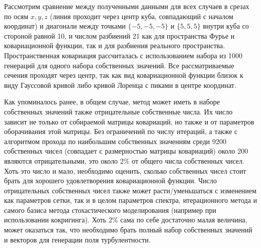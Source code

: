 Рассмотрим сравнение между полученными данными для всех случаев в срезах по осям $x, y, z$ (линия проходит через центр куба, совпадающий с началом координат) и диагонали между точками $\{-5, -5, -5\}$ и $\{5, 5, 5\}$ внутри куба со стороной равной 10, и числом разбиений 21 как для пространства Фурье и ковариационной функции, так и для разбиения реального пространства. Пространственная ковариация рассчиталась с использованием набора из 1000 генераций для одного набора собственных значений. Все рассматриваемые сечения проходят через центр, так как вид ковариационной функции близок к виду Гауссовой кривой либо кривой Лоренца с пиками в центре координат.

Как упоминалось ранее, в общем случае, метод может иметь в наборе собственных значений также отрицательные собственные числа. Их число зависит не только от собираемой матрицы ковариаций, но также и от параметров оборачивания этой матрицы. Без ограничений по числу итераций, а также с алгоритмом прохода по наибольшим собственных значениям среди 9200 собственных чисел (совпадает с размерностью матрицы ковариаций) около 200 являются отрицательными, это около $2\%$ от общего числа собственных чисел. Хоть это число и мало, необходимо оценить, сколько собственных чисел стоит брать для хорошего удовлетворения ковариационной функции. Число отрицательных собственных чисел также может расти/уменьшаться с изменением как параметров сетки, так и в целом параметров спектра, итерационного метода и самого базиса метода стохастического моделирования (например при использовании кокригинга). Хоть $2\%$ сама по себе достаточно малая величина, может оказаться так, что необходимо брать полный набор собственных значений и векторов для генерации поля турбулентности.

